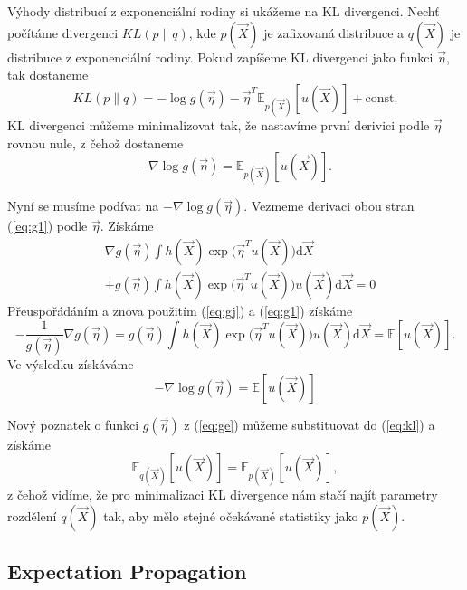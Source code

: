 Výhody distribucí z exponenciální rodiny si ukážeme na KL divergenci.
Nechť počítáme divergenci $KL(p \| q)$, kde $p(\vec{X})$ je zafixovaná distribuce a $q(\vec{X})$ je distribuce z exponenciální rodiny.
Pokud zapíšeme KL divergenci jako funkci $\vec\eta$, tak dostaneme
\begin{equation}
KL(p \| q) = - \log g(\vec\eta) - \vec\eta^T \mathbb{E}_{p(\vec{X})}[u(\vec{X})] + \mathrm{const}.
\end{equation}
KL divergenci můžeme minimalizovat tak, že nastavíme první derivici podle $\vec\eta$ rovnou nule, z čehož dostaneme
\begin{equation}
-\nabla \log g(\vec\eta) = \mathbb{E}_{p(\vec{X})}[u(\vec{X})].
\label{eq:kl}
\end{equation}

Nyní se musíme podívat na $- \nabla \log g(\vec\eta)$.
Vezmeme derivaci obou stran (\ref{eq:g1}) podle $\vec\eta$.
Získáme
\begin{align}
& \nabla g(\vec\eta) \int h(\vec{X}) \exp \big(\vec\eta^T u(\vec{X}) \big) \mathrm{d}\vec{X} \\
& + g(\vec\eta) \int h(\vec{X}) \exp \big(\vec\eta^T u(\vec{X})\big) u(\vec{X}) \mathrm{d}\vec{X} = 0 \nonumber
\end{align}
Přeuspořádáním a znova použitím (\ref{eq:gj}) a (\ref{eq:g1}) získáme
\begin{equation}
-\frac{1}{g(\vec\eta)}\nabla g(\vec\eta)
= g(\vec\eta) \int h(\vec{X}) \exp\big(\vec\eta^T u(\vec{X})\big) u(\vec{X}) \mathrm{d}\vec{X} = \mathbb{E}[u(\vec{X})].
\end{equation}
Ve výsledku získáváme 
\begin{equation}
- \nabla \log g(\vec\eta) = \mathbb{E}[u(\vec{X})]
\label {eq:ge}
\end{equation}

Nový poznatek o funkci $g(\vec\eta)$ z (\ref{eq:ge}) můžeme substituovat do (\ref{eq:kl}) a získáme
\begin{equation}
\mathbb{E}_{q(\vec{X})}[u(\vec{X})] = \mathbb{E}_{p(\vec{X})}[u(\vec{X})],
\label{eq:ee}
\end{equation}
z čehož vidíme, že pro minimalizaci KL divergence nám stačí najít parametry rozdělení $q(\vec{X})$ tak, aby mělo stejné očekávané statistiky jako $p(\vec{X})$.

\subsection{Expectation Propagation}


